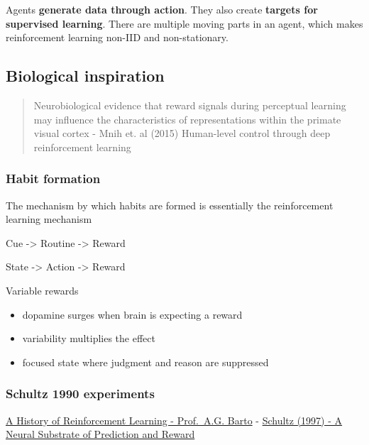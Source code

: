 \documentclass[]{article}
\providecommand{\tightlist}{%
  \setlength{\itemsep}{0pt}\setlength{\parskip}{0pt}}
\begin{document}
Agents \textbf{generate data through action}. They also create
\textbf{targets for supervised learning}. There are multiple moving
parts in an agent, which makes reinforcement learning non-IID and
non-stationary.

\hypertarget{biological-inspiration}{%
\subsection{Biological inspiration}\label{biological-inspiration}}

\begin{quote}
Neurobiological evidence that reward signals during perceptual learning
may influence the characteristics of representations within the primate
visual cortex - Mnih et. al (2015) Human-level control through deep
reinforcement learning
\end{quote}

\hypertarget{habit-formation}{%
\subsubsection{Habit formation}\label{habit-formation}}

The mechanism by which habits are formed is essentially the
reinforcement learning mechanism

Cue -\textgreater{} Routine -\textgreater{} Reward

State -\textgreater{} Action -\textgreater{} Reward

Variable rewards

\begin{itemize}
\tightlist
\item
  dopamine surges when brain is expecting a reward
\item
  variability multiplies the effect
\item
  focused state where judgment and reason are suppressed
\end{itemize}

\hypertarget{schultz-1990-experiments}{%
\subsubsection{Schultz 1990
experiments}\label{schultz-1990-experiments}}

\href{https://www.youtube.com/watch?v=ul6B2oFPNDM}{A History of
Reinforcement Learning - Prof.~A.G. Barto} -
\href{https://github.com/ADGEfficiency/dsr-rl/blob/master/literature/classic_rl/1997_Schultz_neural_substrate_reward.pdf}{Schultz
(1997) - A Neural Substrate of Prediction and Reward}
\end{document}
